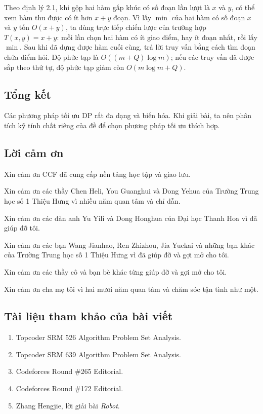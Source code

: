 \documentclass[11pt]{article}
\begin{document}
Theo định lý 2.1, khi gộp hai hàm gấp khúc có số đoạn lần lượt là \(x\) và
\(y\), có thể xem hàm thu được có ít hơn \(x+y\) đoạn. Vì lấy \(\min\) của hai
hàm có số đoạn \(x\) và \(y\) tốn \(O(x+y)\), ta dùng trực tiếp chiến lược của
trường hợp \(T(x,y)=x+y\): mỗi lần chọn hai hàm có ít giao điểm, hay ít đoạn
nhất, rồi lấy \(\min\). Sau khi đã dựng được hàm cuối cùng, trả lời truy vấn
bằng cách tìm đoạn chứa điểm hỏi. Độ phức tạp là \(O((m+Q)\log m)\); nếu các
truy vấn đã được sắp theo thứ tự, độ phức tạp giảm còn \(O(m\log m+Q)\).

\subsection{Tổng kết}

Các phương pháp tối ưu DP rất đa dạng và biến hóa. Khi giải bài, ta nên phân
tích kỹ tính chất riêng của đề để chọn phương pháp tối ưu thích hợp.

\subsection{Lời cảm ơn}

Xin cảm ơn CCF đã cung cấp nền tảng học tập và giao lưu.

Xin cảm ơn các thầy Chen Heli, You Guanghui và Dong Yehua của Trường Trung học
số 1 Thiệu Hưng vì nhiều năm quan tâm và chỉ dẫn.

Xin cảm ơn các đàn anh Yu Yili và Dong Honghua của Đại học Thanh Hoa vì đã giúp
đỡ tôi.

Xin cảm ơn các bạn Wang Jianhao, Ren Zhizhou, Jia Yuekai và những bạn khác của
Trường Trung học số 1 Thiệu Hưng vì đã giúp đỡ và gợi mở cho tôi.

Xin cảm ơn các thầy cô và bạn bè khác từng giúp đỡ và gợi mở cho tôi.

Xin cảm ơn cha mẹ tôi vì hai mươi năm quan tâm và chăm sóc tận tình như một.

\subsection*{Tài liệu tham khảo của bài viết}

\begin{enumerate}
  \item Topcoder SRM 526 Algorithm Problem Set Analysis.
  \item Topcoder SRM 639 Algorithm Problem Set Analysis.
  \item Codeforces Round \#265 Editorial.
  \item Codeforces Round \#172 Editorial.
  \item Zhang Hengjie, lời giải bài \emph{Robot}.
\end{enumerate}
\end{document}

